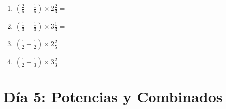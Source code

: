 \documentclass[12pt]{article}
\begin{document}
\begin{enumerate}
\item \large $ \left( \frac{2}{5} - \frac{1}{5} \right) \times 2 \frac{2}{3} = $ \vspace{1.6cm}
\item \large $ \left( \frac{1}{3} - \frac{1}{3} \right) \times 3 \frac{1}{3} = $ \vspace{1.6cm}
\item \large $ \left( \frac{1}{2} - \frac{1}{2} \right) \times 2 \frac{2}{5} = $ \vspace{1.6cm}
\item \large $ \left( \frac{1}{2} - \frac{1}{3} \right) \times 3 \frac{2}{3} = $ \vspace{1.6cm}
\end{enumerate}\newpage
\section*{Día 5: Potencias y Combinados}
\end{document}
